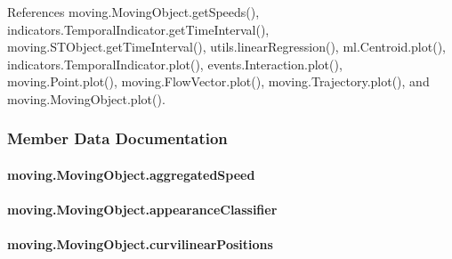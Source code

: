 References moving.\-Moving\-Object.\-get\-Speeds(), indicators.\-Temporal\-Indicator.\-get\-Time\-Interval(), moving.\-S\-T\-Object.\-get\-Time\-Interval(), utils.\-linear\-Regression(), ml.\-Centroid.\-plot(), indicators.\-Temporal\-Indicator.\-plot(), events.\-Interaction.\-plot(), moving.\-Point.\-plot(), moving.\-Flow\-Vector.\-plot(), moving.\-Trajectory.\-plot(), and moving.\-Moving\-Object.\-plot().



\subsubsection{Member Data Documentation}
\hypertarget{classmoving_1_1MovingObject_a030eb07d7d94998b860272b4396ce5a4}{
\paragraph[{aggregated\-Speed}]{\setlength{\rightskip}{0pt plus 5cm}moving.\-Moving\-Object.\-aggregated\-Speed}}\label{classmoving_1_1MovingObject_a030eb07d7d94998b860272b4396ce5a4}
\hypertarget{classmoving_1_1MovingObject_aa523c61416384436bff7bfe4d91074fd}{
\paragraph[{appearance\-Classifier}]{\setlength{\rightskip}{0pt plus 5cm}moving.\-Moving\-Object.\-appearance\-Classifier}}\label{classmoving_1_1MovingObject_aa523c61416384436bff7bfe4d91074fd}
\hypertarget{classmoving_1_1MovingObject_a9f9ba9bddc49b8cf1bdaafb94a3f4bd5}{
\paragraph[{curvilinear\-Positions}]{\setlength{\rightskip}{0pt plus 5cm}moving.\-Moving\-Object.\-curvilinear\-Positions}}\label{classmoving_1_1MovingObject_a9f9ba9bddc49b8cf1bdaafb94a3f4bd5}
